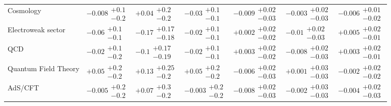 \begin{table}[H]
\begin{tabular}{lllllll}
Cosmology & $-0.008\substack{+0.1 \\ -0.2}$ & $+0.04\substack{+0.2 \\ -0.2}$ & $-0.03\substack{+0.1 \\ -0.1}$ & $-0.009\substack{+0.02 \\ -0.03}$ & $-0.003\substack{+0.02 \\ -0.03}$ & $-0.006\substack{+0.01 \\ -0.02}$ \\
Electroweak sector & $-0.06\substack{+0.1 \\ -0.1}$ & $-0.17\substack{+0.17 \\ -0.18}$ & $-0.02\substack{+0.1 \\ -0.1}$ & $+0.002\substack{+0.02 \\ -0.02}$ & $-0.01\substack{+0.02 \\ -0.03}$ & $+0.005\substack{+0.02 \\ -0.01}$ \\
QCD & $-0.02\substack{+0.1 \\ -0.2}$ & $-0.1\substack{+0.17 \\ -0.19}$ & $-0.02\substack{+0.1 \\ -0.1}$ & $+0.003\substack{+0.02 \\ -0.02}$ & $-0.008\substack{+0.02 \\ -0.03}$ & $+0.003\substack{+0.02 \\ -0.01}$ \\
Quantum Field Theory & $+0.05\substack{+0.2 \\ -0.2}$ & $+0.13\substack{+0.25 \\ -0.2}$ & $+0.05\substack{+0.2 \\ -0.2}$ & $-0.006\substack{+0.02 \\ -0.03}$ & $+0.001\substack{+0.03 \\ -0.03}$ & $-0.002\substack{+0.02 \\ -0.02}$ \\
AdS/CFT & $-0.005\substack{+0.2 \\ -0.2}$ & $+0.07\substack{+0.3 \\ -0.2}$ & $-0.003\substack{+0.2 \\ -0.2}$ & $-0.008\substack{+0.02 \\ -0.03}$ & $-0.002\substack{+0.03 \\ -0.03}$ & $-0.004\substack{+0.02 \\ -0.03}$ \\
\bottomrule
\end{tabular}\normalsize\renewcommand{\arraystretch}{1}
\end{table}
